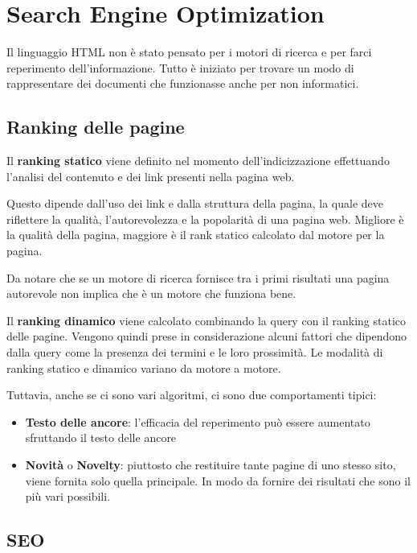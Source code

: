
\section{Search Engine Optimization}

Il linguaggio HTML non è stato pensato per i motori di ricerca e per farci reperimento dell'informazione. Tutto è iniziato per trovare un modo di rappresentare dei documenti che funzionasse anche per non informatici.

\subsection{Ranking delle pagine}

Il \textbf{ranking statico} viene definito nel momento dell'indicizzazione effettuando l'analisi del contenuto e dei link presenti nella pagina web.

Questo dipende dall'uso dei link e dalla struttura della pagina, la quale deve riflettere la qualità, l'autorevolezza e la popolarità di una pagina web. 
Migliore è la qualità della pagina, maggiore è il rank statico calcolato dal motore per la pagina.

Da notare che se un motore di ricerca fornisce tra i primi risultati una pagina autorevole non implica che è un motore che funziona bene.

Il \textbf{ranking dinamico} viene calcolato combinando la query con il ranking statico delle pagine. Vengono quindi prese in considerazione alcuni fattori che dipendono dalla query come la presenza dei termini e le loro prossimità.
Le modalità di ranking statico e dinamico variano da motore a motore.

Tuttavia, anche se ci sono vari algoritmi, ci sono due comportamenti tipici:

\begin{itemize}
	\item \textbf{Testo delle ancore}: l’efficacia del reperimento può essere aumentato sfruttando il testo delle ancore
	\item \textbf{Novità} o \textbf{Novelty}: piuttosto che restituire tante pagine di uno stesso sito, viene fornita solo quella principale. In modo da fornire dei risultati che sono il più vari possibili.
\end{itemize}

\subsection{SEO}

